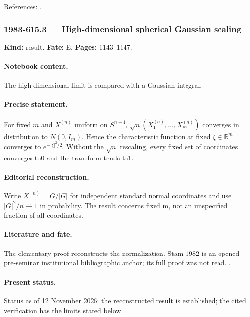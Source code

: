 \noindent References: \citep{nist2026bessel}.\par

\subsubsection{1983-615.3 --- High-dimensional spherical Gaussian scaling}

\label{item:1983-615.3}

\noindent\textbf{Kind:} result. \textbf{Fate:} E. \textbf{Pages:} 1143--1147.\par

\paragraph{Notebook content.} The high-dimensional limit is compared with a Gaussian integral.

\paragraph{Precise statement.} For fixed $m$ and $X^{(n)}$ uniform on $S^{n-1}$, $\sqrt n(X_1^{(n)},\ldots,X_m^{(n)})$ converges in distribution to $N(0,I_m)$. Hence the characteristic function at fixed $\xi\in\mathbb R^m$ converges to $e^{-|\xi|^2/2}$. Without the $\sqrt n$ rescaling, every fixed set of coordinates converges to0 and the transform tends to1.

\paragraph{Editorial reconstruction.} Write $X^{(n)}=G/|G|$ for independent standard normal coordinates and use $|G|^2/n\to1$ in probability. The result concerns fixed m, not an unspecified fraction of all coordinates.

\paragraph{Literature and fate.} The elementary proof reconstructs the normalization. Stam 1982 is an opened pre-seminar institutional bibliographic anchor; its full proof was not read. \citep{stam1982spheres}.

\paragraph{Present status.} Status as of 12 November 2026: the reconstructed result is established; the cited verification has the limits stated below.

